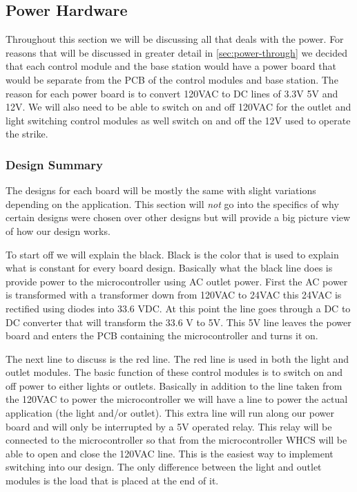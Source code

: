 \subsection{Power Hardware}
\label{sec:power-hw}

Throughout this section we will be discussing all that deals with the power.
For reasons that will be discussed in greater detail in
\autoref{sec:power-through} we decided that each control module and the base
station would have a power board that would be separate from the PCB of the
control modules and base station.  The reason for each power board is to
convert 120VAC to DC lines of 3.3V 5V and 12V. We will also need to be able to
switch on and off 120VAC for the outlet and light switching control modules as
well switch on and off the 12V used to operate the strike.

\subsubsection{Design Summary}
The designs for each board will be mostly the same with slight variations
depending on the application. This section will \emph{not} go
into the specifics of why certain designs were chosen over other designs but
will provide a big picture view of how our design works.

To start off we will explain the black. Black is the color that is used to
explain what is constant for every board design. Basically what the black line
does is provide power to the microcontroller using AC outlet power. First the
AC power is transformed with a transformer down from 120VAC to 24VAC this 24VAC
is rectified using diodes into 33.6 VDC.  At this point the line goes through a
DC to DC converter that will transform the 33.6 V to 5V. This 5V line leaves
the power board and enters the PCB containing the microcontroller and turns it
on.


The next line to discuss is the red line. The red line is used in both the
light and outlet modules. The basic function of these control modules is to
switch on and off power to either lights or outlets. Basically in addition to
the line taken from the 120VAC to power the microcontroller we will have a line
to power the actual application (the light and/or outlet). This extra line will
run along our power board and will only be interrupted by a 5V operated relay.
This relay will be connected to the microcontroller so that from the
microcontroller WHCS will be able to open and close the 120VAC line. This is
the easiest way to implement switching into our design. The only difference
between the light and outlet modules is the load that is placed at the end of
it.

